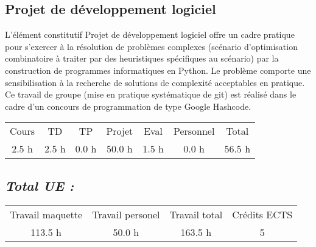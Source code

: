 \subsection{Projet de développement logiciel}%
\label{subsec:Projetdedveloppementlogiciel}%

%
L'élément constitutif Projet de développement logiciel offre un cadre pratique pour s’exercer à la résolution de problèmes complexes (scénario d'optimisation combinatoire à traiter par des heuristiques spécifiques au scénario) par la construction de programmes informatiques en Python. Le problème comporte une sensibilisation à la recherche de solutions de complexité acceptables en pratique. Ce travail de groupe (mise en pratique systématique de git) est réalisé dans le cadre d’un concours de programmation de type Google Hashcode.%
\begin{longtable}{c c c c c c c}%
\hline%
Cours&TD&TP&Projet&Eval&Personnel&Total\\%
2.5 h&2.5 h&0.0 h&50.0 h&1.5 h&0.0 h&56.5 h\\%
\hline%
\end{longtable}%
\subsection{\textit{Total UE :}}%
\label{subsec:textitTotalUE}%

%
\begin{longtable}{c c c c}%
\hline%
Travail maquette&Travail personel&Travail total&Crédits ECTS\\%
113.5 h&50.0 h&163.5 h&5\\%
\hline%
\end{longtable}